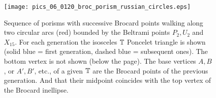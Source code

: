 \begin{figure}[H]
    \centering
    \texttt{[image: pics\_06\_0120\_broc\_porism\_russian\_circles.eps]}
    \caption{Sequence of porisms with successive Brocard points walking along two circular arcs (red) bounded by the Beltrami points $P_2,U_2$ and $X_{15}$. For each generation the isosceles $\mathbb{T}$ Poncelet triangle is shown (solid blue = first generation, dashed blue = subsequent ones). The bottom vertex is not shown (below the page). The base vertices $A,B$, or $A',B'$, etc., of a given $\mathbb{T}$ are the Brocard points of the previous generation. And that their midpoint coincides with the top vertex of the Brocard inellipse.}
    \label{fig:russian-dolls-10}
\end{figure}


